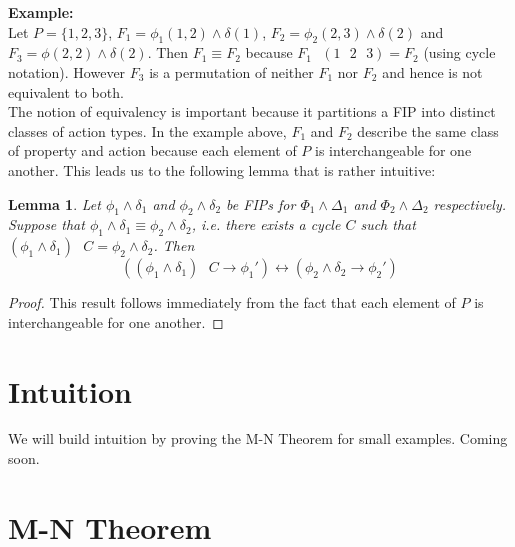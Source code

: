 \documentclass[12pt]{article}
\newtheorem{lemma}{Lemma}
\newcommand{\msp}{\text{ }}
\begin{document}
\noindent \textbf{Example:}\\
Let $P=\{1,2,3\}$, $F_1 = \phi_1(1,2) \land \delta(1)$, $F_2 = \phi_2(2,3) \land \delta(2)$ and $F_3 = \phi(2,2) \land \delta(2)$.  Then $F_1 \equiv F_2$ because $F_1 \msp (1 \msp 2 \msp 3) = F_2$ (using cycle notation).  However $F_3$ is a permutation of neither $F_1$ nor $F_2$ and hence is not equivalent to both.\\

The notion of equivalency is important because it partitions a FIP into distinct classes of action types.  In the example above, $F_1$ and $F_2$ describe the same class of property and action because each element of $P$ is interchangeable for one another.  This leads us to the following lemma that is rather intuitive:

\begin{lemma}
  Let $\phi_1\land\delta_1$ and $\phi_2\land\delta_2$ be FIPs for $\Phi_1\land\Delta_1$ and $\Phi_2\land\Delta_2$ respectively.  Suppose that $\phi_1\land\delta_1 \equiv \phi_2\land\delta_2$, i.e. there exists a cycle $C$ such that $(\phi_1\land\delta_1) \msp C = \phi_2\land\delta_2$.  Then
  $$((\phi_1 \land \delta_1) \msp C \rightarrow \phi_1') \leftrightarrow (\phi_2 \land \delta_2 \rightarrow \phi_2')$$
\end{lemma}
\begin{proof}
  This result follows immediately from the fact that each element of $P$ is interchangeable for one another.
\end{proof}


\section{Intuition}
We will build intuition by proving the M-N Theorem for small examples.  Coming soon.


\section{M-N Theorem}
\end{document}
